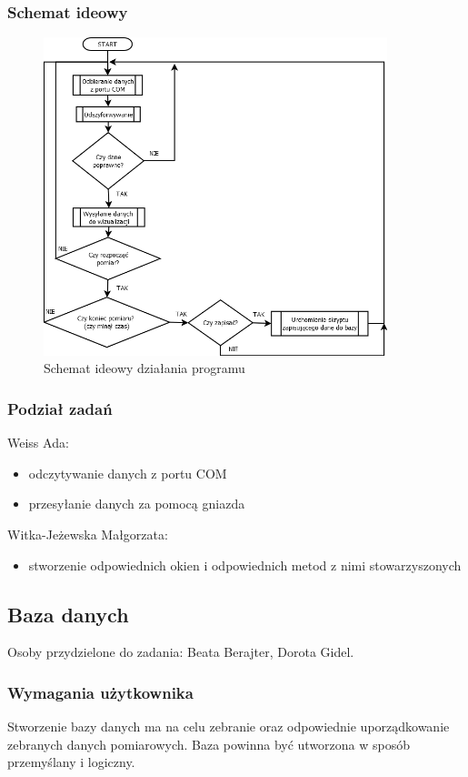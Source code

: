 \documentclass{article}
\begin{document}
\subsubsection{Schemat ideowy}
\begin{figure}[h!]
\label{fig:program}
\centering
\includegraphics[width=10cm]{programdia.png}
\caption{Schemat ideowy działania programu}
\end{figure}
\subsubsection{Podział zadań}


Weiss Ada:
\begin{itemize}
\item odczytywanie danych z portu COM
\item przesyłanie danych za pomocą gniazda
\end{itemize}

Witka-Jeżewska Małgorzata:
\begin{itemize}
    \item stworzenie odpowiednich okien i odpowiednich metod z nimi stowarzyszonych
\end{itemize}


\subsection{Baza danych}
Osoby przydzielone do zadania: Beata Berajter, Dorota Gidel.
\subsubsection{Wymagania użytkownika}
Stworzenie bazy danych ma na celu zebranie oraz odpowiednie uporządkowanie zebranych danych pomiarowych. Baza powinna być utworzona w sposób przemyślany i logiczny.
\end{document}
